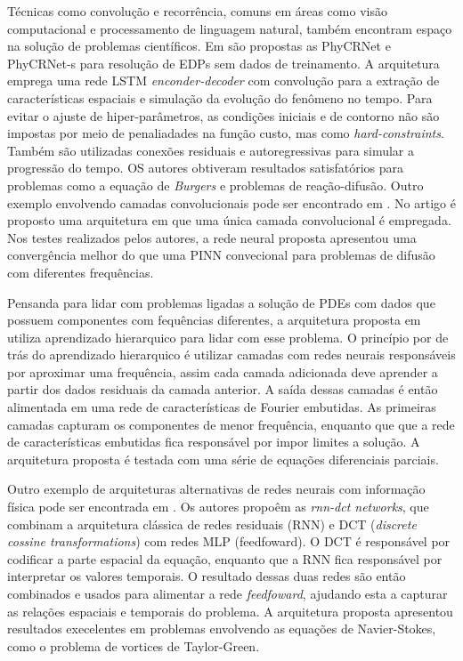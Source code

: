 Técnicas como convolução e recorrência, comuns em áreas como visão computacional 
e processamento de linguagem natural, também encontram espaço na solução de problemas
científicos. Em \cite{ren-etal:2022-phycrnet} são propostas as PhyCRNet e PhyCRNet-s
para resolução de EDPs sem dados de treinamento. A arquitetura emprega uma rede
LSTM \textit{enconder-decoder} com convolução para a extração de características
espaciais e simulação da evolução do fenômeno no tempo.
Para evitar o ajuste de hiper-parâmetros, as condições iniciais e de contorno não
são impostas por meio de penaliadades na função custo, mas como \textit{hard-constraints}.
Também são utilizadas conexões residuais e autoregressivas para simular a progressão
do tempo. OS autores obtiveram resultados satisfatórios para problemas como a 
equação de \textit{Burgers} e problemas de reação-difusão.
Outro exemplo envolvendo camadas convolucionais pode ser encontrado em 
\cite{shi-etal:24-convnet}. No artigo é proposto uma arquitetura em que uma única 
camada convolucional é empregada. Nos testes realizados pelos autores, a rede 
neural proposta apresentou uma convergência melhor do que uma PINN convecional 
para problemas de difusão com diferentes frequências.

Pensanda para lidar com problemas ligadas a solução de PDEs com dados que possuem 
componentes com fequências diferentes, a arquitetura proposta em \cite{han-etal:2023-hierarchical-learning}
utiliza aprendizado hierarquico para lidar com esse problema.
O princípio por de trás do aprendizado hierarquico é utilizar camadas com redes
neurais responsáveis por aproximar uma frequência, assim cada camada 
adicionada deve aprender a partir dos dados residuais da camada anterior.
A saída dessas camadas é então alimentada em uma rede de características de Fourier
embutidas. 
As primeiras camadas capturam os componentes de menor frequência, enquanto que
que a rede de características embutidas fica responsável por impor limites a solução.
A arquitetura proposta é testada com uma série de equações diferenciais parciais.

Outro exemplo de arquiteturas alternativas de redes neurais com informação física
pode ser encontrada em \cite{benjamin-etal:2022-rnn-dct-networks}. 
Os autores propoêm as \textit{rnn-dct networks}, que combinam a arquitetura clássica
de redes residuais (RNN) e DCT (\textit{discrete cossine transformations}) com 
redes MLP (feedfoward). O DCT é responsável por codificar a parte espacial da equação,
enquanto que a RNN fica responsável por interpretar os valores temporais.
O resultado dessas duas redes são então combinados e usados para alimentar a rede
\textit{feedfoward}, ajudando esta a capturar as relações espaciais e temporais do
problema. A arquitetura proposta apresentou resultados execelentes em problemas 
envolvendo as equações de Navier-Stokes, como o problema de vortices de Taylor-Green.


